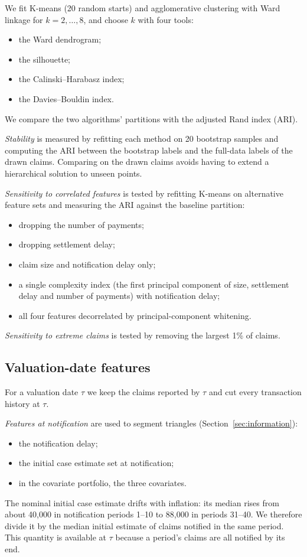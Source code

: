 We fit K-means (20 random starts) and agglomerative clustering with Ward linkage for $k = 2,\dots,8$, and choose $k$ with four tools:
\begin{itemize}[leftmargin=*]
\item the Ward dendrogram;
\item the silhouette;
\item the Calinski--Harabasz index;
\item the Davies--Bouldin index.
\end{itemize}

We compare the two algorithms' partitions with the adjusted Rand index (ARI).

\emph{Stability} is measured by refitting each method on 20 bootstrap samples and computing the ARI between the bootstrap labels and the full-data labels of the drawn claims. Comparing on the drawn claims avoids having to extend a hierarchical solution to unseen points.

\emph{Sensitivity to correlated features} is tested by refitting K-means on alternative feature sets and measuring the ARI against the baseline partition:
\begin{itemize}[leftmargin=*]
\item dropping the number of payments;
\item dropping settlement delay;
\item claim size and notification delay only;
\item a single complexity index (the first principal component of size, settlement delay and number of payments) with notification delay;
\item all four features decorrelated by principal-component whitening.
\end{itemize}

\emph{Sensitivity to extreme claims} is tested by removing the largest 1\% of claims.

\subsection{Valuation-date features}
\label{sec:meth-features}

For a valuation date $\tau$ we keep the claims reported by $\tau$ and cut every transaction history at $\tau$.

\emph{Features at notification} are used to segment triangles (Section~\ref{sec:information}):
\begin{itemize}[leftmargin=*]
\item the notification delay;
\item the initial case estimate set at notification;
\item in the covariate portfolio, the three covariates.
\end{itemize}
The nominal initial case estimate drifts with inflation: its median rises from about 40,000 in notification periods 1--10 to 88,000 in periods 31--40. We therefore divide it by the median initial estimate of claims notified in the same period. This quantity is available at $\tau$ because a period's claims are all notified by its end.

